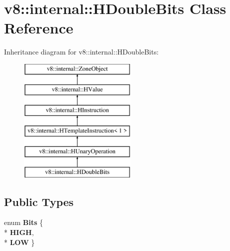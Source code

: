 \hypertarget{classv8_1_1internal_1_1_h_double_bits}{}\section{v8\+:\+:internal\+:\+:H\+Double\+Bits Class Reference}
\label{classv8_1_1internal_1_1_h_double_bits}
Inheritance diagram for v8\+:\+:internal\+:\+:H\+Double\+Bits\+:\begin{figure}[H]
\begin{center}
\leavevmode
\includegraphics[height=6.000000cm]{classv8_1_1internal_1_1_h_double_bits}
\end{center}
\end{figure}
\subsection*{Public Types}
\begin{DoxyCompactItemize}
\item 
enum {\bfseries Bits} \{ \\*
{\bfseries H\+I\+GH}, 
\\*
{\bfseries L\+OW}
 \}\hypertarget{classv8_1_1internal_1_1_h_double_bits_a879e77c7617708c6115c40690d1d7c47}{}\label{classv8_1_1internal_1_1_h_double_bits_a879e77c7617708c6115c40690d1d7c47}

\end{DoxyCompactItemize}
